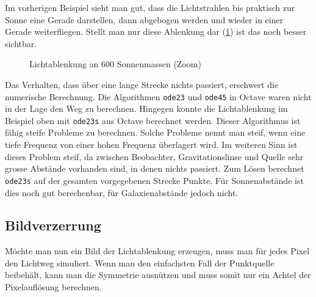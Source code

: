 \begin{refsection}
Im vorherigen Beispiel sieht man gut, dass die Lichtstrahlen bis
praktisch zur Sonne eine Gerade darstellen, dann abgebogen werden und
wieder in einer Gerade weiterfliegen.  Stellt man nur diese Ablenkung
dar (\ref{fig:lichtablenkung600SonneZoom}) ist das noch besser
sichtbar.

\begin{figure}
  \centering
  \caption{Lichtablenkung an 600 Sonnenmassen (Zoom)}
  \label{fig:lichtablenkung600SonneZoom}
\end{figure}

Das Verhalten, dass über eine lange Strecke nichts passiert, erschwert
die numerische Berechnung.  Die Algorithmen \texttt{ode23} und \texttt{ode45} in Octave
waren nicht in der Lage den Weg zu berechnen.  Hingegen konnte die
Lichtablenkung im Beispiel oben mit \texttt{ode23s} aus Octave berechnet
werden.  Dieser Algorithmus ist fähig steife Probleme zu berechnen.
Solche Probleme nennt man steif, wenn eine tiefe Frequenz von einer
hohen Frequenz überlagert wird.  Im weiteren Sinn ist dieses Problem
steif, da zwischen Beobachter, Gravitationslinse und Quelle sehr
grosse Abstände vorhanden sind, in denen nichts passiert.  Zum Lösen
berechnet \texttt{ode23s} auf der gesamten vorgegebenen Strecke Punkte.  Für
Sonnenabstände ist dies noch gut berechenbar, für Galaxienabstände
jedoch nicht.

\subsection{Bildverzerrung}
Möchte man nun ein Bild der Lichtablenkung erzeugen, muss man für
jedes Pixel den Lichtweg simuliert.  Wenn man den einfachsten Fall der
Punktquelle beibehält, kann man die Symmetrie ausnützen und muss somit
nur ein Achtel der Pixelauflösung berechnen.


\end{refsection}
